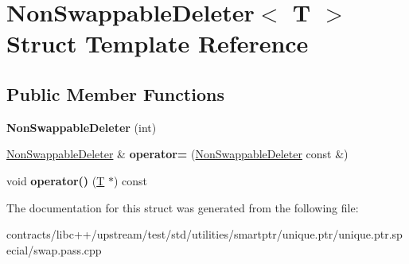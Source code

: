 \hypertarget{struct_non_swappable_deleter}{}\section{Non\+Swappable\+Deleter$<$ T $>$ Struct Template Reference}
\label{struct_non_swappable_deleter}
\subsection*{Public Member Functions}
\begin{DoxyCompactItemize}
\item 
\mbox{\label{struct_non_swappable_deleter_aebff293647291bce00088c64109298aa}} 
{\bfseries Non\+Swappable\+Deleter} (int)
\item 
\mbox{\label{struct_non_swappable_deleter_a21ce90b3e055fc27f3fb7bc7f05f98d1}} 
\mbox{\hyperlink{struct_non_swappable_deleter}{Non\+Swappable\+Deleter}} \& {\bfseries operator=} (\mbox{\hyperlink{struct_non_swappable_deleter}{Non\+Swappable\+Deleter}} const \&)
\item 
\mbox{\label{struct_non_swappable_deleter_abaf46bdb7cac577590595980b12213bc}} 
void {\bfseries operator()} (\mbox{\hyperlink{struct_t}{T}} $\ast$) const
\end{DoxyCompactItemize}


The documentation for this struct was generated from the following file\+:\begin{DoxyCompactItemize}
\item 
contracts/libc++/upstream/test/std/utilities/smartptr/unique.\+ptr/unique.\+ptr.\+special/swap.\+pass.\+cpp\end{DoxyCompactItemize}
